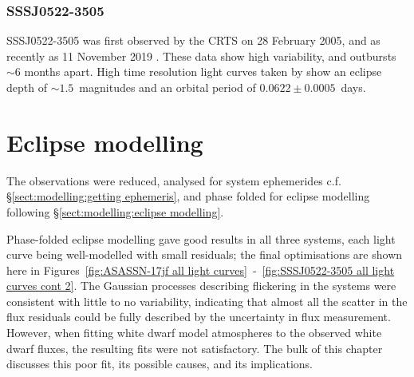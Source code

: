 \subsubsection{SSSJ0522-3505}
\label{sect:three white dwarfs:SSSJ0522-3505 prior observations}
SSSJ0522-3505 was first observed by the CRTS on 28 February 2005, and as recently as 11 November 2019 \citep{drake2009}. These data show high variability, and outbursts $\sim$6 months apart. High time resolution light curves taken by \citet{paterson2019} show an eclipse depth of $\sim1.5$\ magnitudes and an orbital period of $0.0622 \pm 0.0005$\ days.


\section{Eclipse modelling}
\label{sect:three white dwarfs:eclipse modelling results}

The observations were reduced, analysed for system ephemerides c.f. \S\ref{sect:modelling:getting ephemeris}, and phase folded for eclipse modelling following \S\ref{sect:modelling:eclipse modelling}.

Phase-folded eclipse modelling gave good results in all three systems, each light curve being well-modelled with small residuals; the final optimisations are shown here in Figures~\ref{fig:ASASSN-17jf all light curves}~-~\ref{fig:SSSJ0522-3505 all light curves cont 2}.
The Gaussian processes describing flickering in the systems were consistent with little to no variability, indicating that almost all the scatter in the flux residuals could be fully described by the uncertainty in flux measurement.
However, when fitting white dwarf model atmospheres to the observed white dwarf fluxes, the resulting fits were not satisfactory. The bulk of this chapter discusses this poor fit, its possible causes, and its implications.


